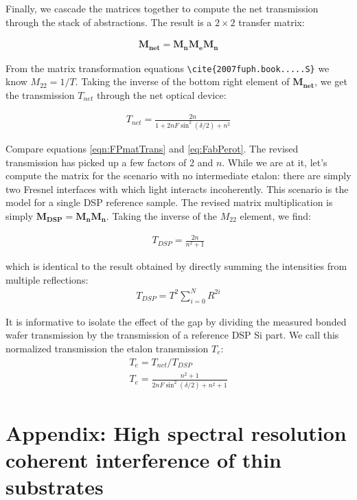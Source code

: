 \documentclass[osajnl,preprint,showpacs,superscriptaddress,12pt]{revtex4-1} %
\begin{document}
Finally, we cascade the matrices together to compute the net transmission through the stack of abstractions.  The result is a $2\times2$ transfer matrix: 

\begin{eqnarray}
\boldsymbol{M_{net}}=\boldsymbol{M_n}\boldsymbol{M_e}\boldsymbol{M_n}
\end{eqnarray}

From the matrix transformation equations \verb|\cite{2007fuph.book.....S}| we know $M_{22}=1/T$.  Taking the inverse of the bottom right element of $\boldsymbol{M_{net}}$, we get the transmission $T_{net}$ through the net optical device: 

\begin{eqnarray}
T_{net}=\frac{2 n}{1+ 2n F\sin ^2(\delta/2)+n^2} \label{eqn:FPmatTrans}
\end{eqnarray}

Compare equations \ref{eqn:FPmatTrans} and \ref{eq:FabPerot}.  The revised transmission has picked up a few factors of 2 and $n$.  While we are at it, let's compute the matrix for the scenario with no intermediate etalon: there are simply two Fresnel interfaces with which light interacts incoherently.  This scenario is the model for a single DSP reference sample. The revised matrix multiplication is simply $\boldsymbol{M_{DSP}}=\boldsymbol{M_n}\boldsymbol{M_n}$.  Taking the inverse of the $M_{22}$ element, we find: 

\begin{eqnarray}
T_{DSP}=\frac{2 n}{n^2+1}\label{eqn:EqofSummedSlab}
\end{eqnarray}

which is identical to the result obtained by directly summing the intensities from multiple reflections:
\begin{eqnarray}
T_{DSP}=T^2 \sum_{i=0}^{N}R^{2i} \label{eqn:multsum}
\end{eqnarray}

It is informative to isolate the effect of the gap by dividing the measured bonded wafer transmission by the transmission of a reference DSP Si part.  We call this normalized transmission the etalon transmission $T_{e}$:
\begin{eqnarray}
T_{e} = T_{net}/T_{DSP} \\
T_{e} = \frac{n^2+1}{2 n F \sin ^2(\delta/2)+n^2+1} \label{eqn:Tetalon}
\end{eqnarray}

\section{Appendix: High spectral resolution coherent interference of thin substrates}
\end{document}
